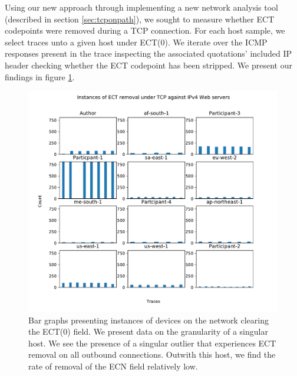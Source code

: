 \documentclass{l4proj}
\begin{document}
Using our new approach through implementing a new network analysis tool (described in section \ref{sec:tcponpath}), we sought to measure whether ECT codepoints were removed during a TCP connection. For each host sample, we select traces unto a given host under ECT(0). We iterate over the ICMP responses present in the trace inspecting the associated quotations' included IP header checking whether the ECT codepoint has been stripped. We present our findings in figure \ref{fig:ect_strip}.

\begin{figure}[H]
    \centering
    \includegraphics[scale=0.7]{dissertation/images/tcp_bar.pdf}
    \caption{Bar graphs presenting instances of devices on the network clearing the ECT(0) field. We present data on the granularity of a singular host. We see the presence of a singular outlier that experiences ECT removal on all outbound connections. Outwith this host, we find the rate of removal of the ECN field relatively low.}
    \label{fig:ect_strip}
\end{figure}
\end{document}

